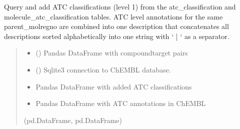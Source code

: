 \documentclass[letterpaper,10pt,english]{sphinxmanual}
\begin{document}
\begin{fulllineitems}
\label{\detokenize{add_chembl_compound_properties:add_chembl_compound_properties.add_atc_classification}}
\pysigstartsignatures
{}
\pysigstopsignatures
\sphinxAtStartPar
Query and add ATC classifications (level 1) from the atc\_classification and molecule\_atc\_classification tables.
ATC level annotations for the same parent\_molregno are combined into one description
that concatenates all descriptions sorted alphabetically into one string with ‘ | ‘ as a separator.
\begin{quote}\begin{description}
\begin{itemize}
\item {} 
\sphinxAtStartPar
{} () \textendash{} Pandas DataFrame with compound\sphinxhyphen{}target pairs

\item {} 
\sphinxAtStartPar
{} () \textendash{} Sqlite3 connection to ChEMBL database.

\end{itemize}

\sphinxAtStartPar
\begin{itemize}
\item {} 
\sphinxAtStartPar
Pandas DataFrame with added ATC classifications 

\item {} 
\sphinxAtStartPar
Pandas DataFrame with ATC annotations in ChEMBL

\end{itemize}


\sphinxAtStartPar
(pd.DataFrame, pd.DataFrame)

\end{description}\end{quote}

\end{fulllineitems}
\end{document}
